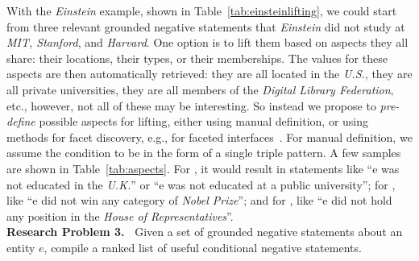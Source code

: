 With the \textit{Einstein} example, shown in Table~\ref{tab:einsteinlifting}, we could start from three relevant grounded negative statements that \textit{Einstein} did not study at \textit{MIT, Stanford}, and \textit{Harvard}. One option is to lift them based on aspects they all share: their locations, their types, or their memberships. The values for these aspects are then automatically retrieved: they are all located in the \textit{U.S.}, they are all private universities, they are all members of the \textit{Digital Library Federation}, etc., however, not all of these may be interesting. So instead we propose to \emph{pre-define} possible aspects for lifting, either using manual definition, or using methods for facet discovery, e.g., for faceted interfaces~\cite{oren2006extending}. For manual definition, we assume the condition to be in the form of a single triple pattern. A few samples are shown in Table~\ref{tab:aspects}. For , it would result in statements like ``e was not educated in the \textit{U.K.}'' or ``e was not educated at a public university''; for , like ``e did not win any category of \textit{Nobel Prize}''; and for , like ``e did not hold any position in the \textit{House of Representatives}''.\\


\noindent
\textbf{Research Problem 3.\ }
Given a set of grounded negative statements about an entity $e$, compile a ranked list of useful conditional negative statements.\\

